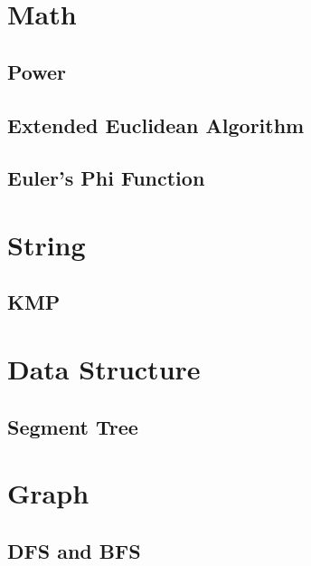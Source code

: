 \documentclass[10pt, a4paper]{article}
\begin{document}
\tableofcontents



\section{Math}

\subsection{Power}


\subsection{Extended Euclidean Algorithm}


\subsection{Euler's Phi Function}




\section{String}

\subsection{KMP}




\section{Data Structure}

\subsection{Segment Tree}




\section{Graph}

\subsection{DFS and BFS}

\end{document}
